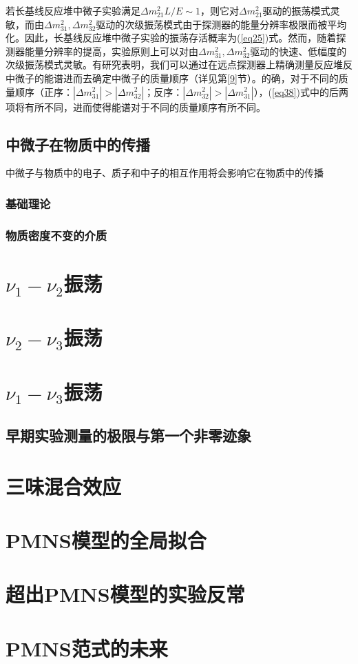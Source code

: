 \documentclass{article}
\begin{document}
	若长基线反应堆中微子实验满足$\Delta m_{21}^2L/E\sim1$，则它对$\Delta m_{21}^2$驱动的振荡模式灵敏，而由$\Delta m_{31}^2,\Delta m_{32}^2$驱动的次级振荡模式由于探测器的能量分辨率极限而被平均化。因此，长基线反应堆中微子实验的振荡存活概率为(\ref{eq25})式。然而，随着探测器能量分辨率的提高，实验原则上可以对由$\Delta m_{31}^2,\Delta m_{32}^2$驱动的快速、低幅度的次级振荡模式灵敏。有研究表明，我们可以通过在远点探测器上精确测量反应堆反中微子的能谱进而去确定中微子的质量顺序（详见第\ref{9}节）。的确，对于不同的质量顺序（正序：$|\Delta m_{31}^2|>|\Delta m_{32}^2|$；反序：$|\Delta m_{32}^2|>|\Delta m_{31}^2|$），(\ref{eq38})式中的后两项将有所不同，进而使得能谱对于不同的质量顺序有所不同。
	\subsection{中微子在物质中的传播\label{2.5}}
	中微子与物质中的电子、质子和中子的相互作用将会影响它在物质中的传播
	
		
	
	
	
	
	
	
	
	
	
	
	
	
	
	
	
	
	\subsubsection{基础理论}
	\subsubsection{物质密度不变的介质\label{2.5.2}}
	\section{$\nu_1-\nu_2$振荡}
	\section{$\nu_2-\nu_3$振荡}
	\section{$\nu_1-\nu_3$振荡}
	\subsection{早期实验测量的极限与第一个非零迹象\label{5.1}}
	\section{三味混合效应}
	\section{PMNS模型的全局拟合}
	\section{超出PMNS模型的实验反常}
	\section{PMNS范式的未来\label{9}}
	\newpage
	\printbibliography
\end{document}

